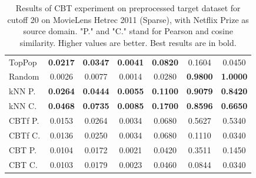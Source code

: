 \begin{table}[hbt]
\begin{tabulary}{\textwidth}{|L|CCCCCC|}
\hline
TopPop & \textbf{0.0217} & \textbf{0.0347} & \textbf{0.0041} & \textbf{0.0820} & 0.1604 & 0.0450 \\
Random & 0.0026 & 0.0077 & 0.0014 & 0.0280 & \textbf{0.9800} & \textbf{1.0000} \\
kNN P. & \textbf{0.0264} & \textbf{0.0444} & \textbf{0.0055} & \textbf{0.1100} & \textbf{0.9079} & \textbf{0.8420} \\
kNN C. & \textbf{0.0468} & \textbf{0.0735} & \textbf{0.0085} & \textbf{0.1700} & \textbf{0.8596} & \textbf{0.6650} \\
CBTf P. & 0.0153 & 0.0264 & 0.0034 & 0.0680 & 0.5627 & 0.5340 \\
CBTf C. & 0.0136 & 0.0250 & 0.0034 & 0.0680 & 0.1110 & 0.0340 \\
CBT P. & 0.0104 & 0.0172 & 0.0021 & 0.0420 & 0.3511 & 0.1450 \\
CBT C. & 0.0103 & 0.0179 & 0.0023 & 0.0460 & 0.0844 & 0.0340 \\
\hline
\end{tabulary}
\caption{Results of CBT experiment on preprocessed target dataset for cutoff 20 on MovieLens Hetrec 2011 (Sparse), with Netflix Prize as source domain. "P." and "C." stand for Pearson and cosine similarity. Higher values are better. Best results are in bold.}
\end{table}

